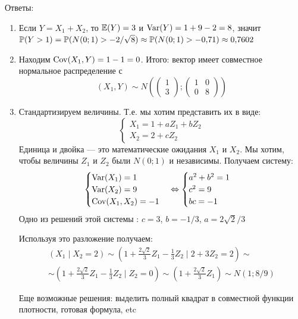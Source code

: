 \documentclass[12pt, a4paper]{article}\usepackage[]{graphicx}\usepackage[]{color}
\begin{document}
\begin{enumerate}
Ответы:
\begin{enumerate}
\item Если $Y=X_1+X_2$, то $\E(Y)=3$ и $\Var(Y)=1+9-2=8$, значит $\P(Y>1)=\P(N(0;1)>-2/\sqrt{8})\approx \P(N(0;1)>-0{,}71)\approx 0{,}7602$
\item Находим $\Cov(X_1,Y)=1-1=0$. Итого: вектор имеет совместное нормальное распределение с
\begin{equation}
(X_1,Y)\sim N\left(
\left(\begin{array}{l}
{1} \\
{3}
\end{array}\right);
\left(\begin{array}{cc}
{1} & {0} \\
{0} & {8}
\end{array}\right)
\right)
\end{equation}
\item Стандартизируем величины. Т.е. мы хотим представить их в виде:
\begin{equation}
\begin{cases}
X_1=1+aZ_1+bZ_2 \\
X_2=2+cZ_2
\end{cases}
\end{equation}
Единица и двойка — это математические ожидания $X_1$ и $X_2$. Мы хотим, чтобы величины $Z_1$ и $Z_2$ были $N(0;1)$ и независимы.
Получаем систему:
\begin{equation}
\begin{cases}
\Var(X_1)=1 \\
\Var(X_2)=9 \\
\Cov(X_1,X_2)=-1
\end{cases} \Leftrightarrow
\begin{cases}
a^2+b^2=1 \\
c^2=9 \\
bc=-1
\end{cases}
\end{equation}
Одно из решений этой системы : $c=3$, $b=-1/3$, $a=2\sqrt{2}/3$

Используя это разложение получаем:
\begin{multline}
\left( X_1 \mid X_2=2\right) \sim \left( 1+\frac{2\sqrt{2}}{3}Z_1-\frac{1}{3}Z_2\mid 2+ 3Z_2=2\right)\sim \\
\sim\left(1+\frac{2\sqrt{2}}{3}Z_1-\frac{1}{3}Z_2\mid Z_2=0\right)\sim \left(1+\frac{2\sqrt{2}}{3}Z_1\right)\sim N(1;8/9)
\end{multline}

Еще возможные решения: выделить полный квадрат в совместной функции плотности, готовая формула, etc


\end{enumerate}
\end{enumerate}
\end{document}
